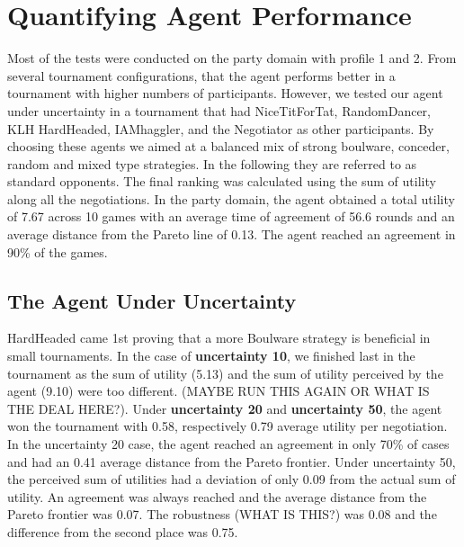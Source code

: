 \documentclass[a4paper,11pt]{article}
\theoremstyle{mytheor}
\begin{document}
\section{Quantifying Agent Performance}
Most of the tests were conducted on the party domain with profile 1 and 2. From several tournament configurations, that the agent performs better in a tournament with higher numbers of participants. However, 
we tested our agent under uncertainty in a tournament that had NiceTitForTat, RandomDancer, KLH HardHeaded, IAMhaggler, and the Negotiator as other participants. By choosing these agents we aimed at a balanced mix of strong boulware, conceder, random and mixed type strategies. In the following they are referred to as standard opponents. The final ranking was calculated using the sum of utility along all the negotiations. In the party domain, the agent obtained a total utility of 7.67 across 10 games with an average time of agreement of 56.6 rounds and an average distance from the Pareto line of 0.13. The agent reached an agreement in 90\% of the games.


\subsection{The Agent Under Uncertainty}
 HardHeaded came 1st proving that a more Boulware strategy is beneficial in small tournaments. In the case of \textbf{uncertainty 10}, we finished last in the tournament as the sum of utility (5.13) and the sum of utility perceived by the agent (9.10) were too different. (MAYBE RUN THIS AGAIN OR WHAT IS THE DEAL HERE?). Under \textbf{uncertainty 20} and \textbf{uncertainty 50}, the agent won the tournament with 0.58, respectively 0.79 average utility per negotiation. In the uncertainty 20 case, the agent reached an agreement in only 70\% of cases and had an 0.41 average distance from the Pareto frontier. Under uncertainty 50, the perceived sum of utilities had a deviation of only 0.09 from the actual sum of utility. An agreement was always reached and the average distance from the Pareto frontier was 0.07. The robustness (WHAT IS THIS?) was 0.08 and the difference from the second place was 0.75.
\end{document}
